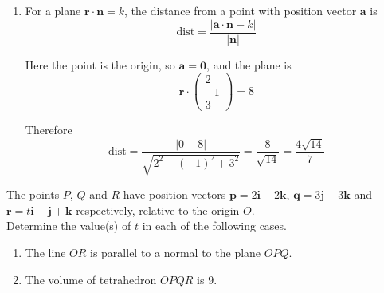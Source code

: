 \documentclass[leqno]{article}
\begin{document}
\begin{enumerate}[
  label=\textbf{\arabic*.},
  leftmargin=*,
  topsep=0pt,
  partopsep=0pt,
  parsep=0pt
]
\begin{djsSolution}
\begin{enumerate}[label=\textbf{(\alph*)}]
  Using the point $P(2,-1,1)$, with position vector $\mathbf p$:
  \[
  k=\mathbf p\cdot \mathbf n
  =
  \begin{pmatrix}
  2\\
  -1\\
  1
  \end{pmatrix}
  \cdot
  \begin{pmatrix}
  2\\
  -1\\
  3
  \end{pmatrix}
  =4+1+3=8
  \]

  So the plane is
  \[
  \mathbf r\cdot
  \begin{pmatrix}
  2\\
  -1\\
  3
  \end{pmatrix}
  =8
  \]

  \item For a plane $\mathbf r\cdot\mathbf n=k$, the distance from a point with position vector $\mathbf a$ is
  \[
  \mathrm{dist}=\frac{\left|\mathbf a\cdot\mathbf n-k\right|}{|\mathbf n|}
  \]

  Here the point is the origin, so $\mathbf a=\mathbf 0$, and the plane is
  \[
  \mathbf r\cdot
  \begin{pmatrix}
  2\\
  -1\\
  3
  \end{pmatrix}
  =8
  \]

  Therefore
  \[
  \mathrm{dist}
  =
  \frac{|0-8|}{\sqrt{2^2+(-1)^2+3^2}}
  =
  \frac{8}{\sqrt{14}}
  =
  \frac{4\sqrt{14}}{7}
  \]
\end{enumerate}
\end{djsSolution}


\newpage

\questionitem

The points $P$, $Q$ and $R$ have position vectors $\mathbf{p}=2\mathbf{i}-2\mathbf{k}$, $\mathbf{q}=3\mathbf{j}+3\mathbf{k}$ and $\mathbf{r}=t\mathbf{i}-\mathbf{j}+\mathbf{k}$ respectively, relative to the origin $O$. \\

Determine the value(s) of $t$ in each of the following cases. \\

\begin{enumerate}[label=\textbf{(\alph*)}]
  \item The line $OR$ is parallel to a normal to the plane $OPQ$.  \\
  \item The volume of tetrahedron $OPQR$ is $9$.  \\
\end{enumerate}


\end{enumerate}
\end{document}

